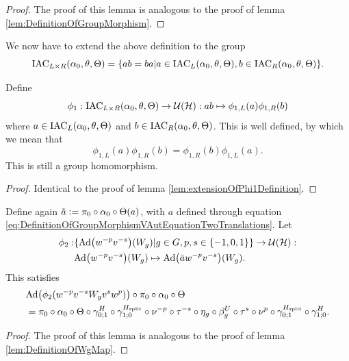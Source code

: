 \documentclass[12pt,a4paper,twoside]{article}
\numberwithin{equation}{section}
\begin{document}
\begin{proof}
	The proof of this lemma is analogous to the proof of lemma \ref{lem:DefinitionOfGroupMorphism}.
\end{proof}
We now have to extend the above definition to the group
\begin{equation}
	\textrm{IAC}_{L\times R}(\alpha_0,\theta,\Theta)=\{ab=ba|a\in\textrm{IAC}_{L}(\alpha_0,\theta,\Theta),b\in\textrm{IAC}_{R}(\alpha_0,\theta,\Theta)\}.
\end{equation}
\begin{lemma}
	Define
	\begin{equation}
		\phi_1:\textrm{IAC}_{L\times R}(\alpha_0,\theta,\Theta)\rightarrow\mathcal U(\mathcal H):ab\mapsto \phi_{1,L}(a)\phi_{1,R}(b)
	\end{equation}
	where $a\in \textrm{IAC}_{L}(\alpha_0,\theta,\Theta)$ and $b\in \textrm{IAC}_{R}(\alpha_0,\theta,\Theta)$. This is well defined, by which we mean that
	\begin{equation}
		\phi_{1,L}(a)\phi_{1,R}(b)=\phi_{1,R}(b)\phi_{1,L}(a).
	\end{equation}
	This is still a group homomorphism.
\end{lemma}
\begin{proof}
	Identical to the proof of lemma \ref{lem:extensionOfPhi1Definition}.
\end{proof}
\begin{lemma}\label{lem:DefinitionOfWgMapTwoTranslations}
	Define again $\tilde{a}\vcentcolon= \pi_0\circ\alpha_0\circ\Theta(a)$, with $a$ defined through equation \eqref{eq:DefinitionOfGroupMorphismVAutEquationTwoTranslations}. Let
	\begin{align}
		\phi_2:&\{\Ad{w^{-p}v^{-s}}(W_g)|g\in G,p,s\in\{-1,0,1\}\}\rightarrow \UU(\HH):\\
		\nonumber
		&\Ad{w^{-p}v^{-s}}(W_g) \mapsto \Ad{\tilde{a} w^{-p}v^{-s}}(W_g).
	\end{align}
	This satisfies
	\begin{align}\label{eq:lemDefinitionOfWgMapConditionTwoTranslations}
		&\Ad{\phi_2(w^{-p}v^{-s}W_g v^{s} w^p)}\circ\pi_0\circ\alpha_0\circ\Theta\\
		\nonumber
		&=\pi_0\circ \alpha_0\circ\Theta\circ\gamma^{H}_{0;1}\circ\gamma^{H_{\text{split}}}_{1;0}\circ\nu^{-p}\circ\tau^{-s}\circ\eta_g\circ\beta_g^U\circ\tau^s\circ\nu^p\circ\gamma^{H_{\text{split}}}_{0;1}\circ\gamma^{H}_{1;0}.
	\end{align}
\end{lemma}
\begin{proof}
	The proof of this lemma is analogous to the proof of lemma \ref{lem:DefinitionOfWgMap}.
\end{proof}
\end{document}
